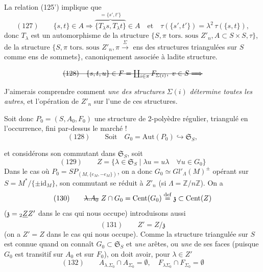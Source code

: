 \documentclass[11pt,a4paper]{article}
\begin{document}
La relation (125') implique que
\[
  (127)\qquad \{s,t\}\in A \Longrightarrow
  \overbrace{\{T_{\lambda}s, T_{\lambda}t\}}^{=\{s',t'\}}\in A
  \quad\text{et}\quad \tau(\{s',t'\}) = \lambda^{2}\,\tau(\{s,t\}),
\]
donc $T_{\lambda}$ est un automorphisme de la structure
$\{S, \pi \text{ tors.\ sous } Z'_n, A\subset S\times S, \tau\}$,
\struck{\ill{}}  de la structure
$\{S, \pi \text{ tors.\ sous } Z'_n, \pi \xrightarrow{\Sigma}$ ens des structures
triangulées sur $S$ comme ens de sommets$\}$, canoniquement associée à ladite
structure.

\[
  \text{\struck{$(128)\quad \{s,t,u\}\in F=\coprod_{i\in\pi} F_{\Sigma(i)},\ v\in S
  \Longrightarrow$}}
\]

J'aimerais comprendre comment \emph{une des structures} $\Sigma(i)$
\emph{détermine toutes les autres}, et l'opération de $Z'_n$ sur l'une de ces
structures.

Soit donc $P_0=(S,A_0,F_0)$ une structure de 2-polyèdre  régulier,
triangulé en l'occurrence, fini par-dessus le marché !
\[
  (128)\qquad \text{Soit}\quad G_0 = \mathrm{Aut}(P_0) \hookrightarrow \mathfrak{S}_S ,
\]


et considérons son \struck{\ill{}} commutant dans $\mathfrak{S}_S$, soit
\[
  (129)\qquad Z = \{\lambda\in\mathfrak{S}_S \mid \lambda u = u\lambda
  \quad \forall u\in G_0\}
\]
Dans le cas où $P_0 = SP_{(M,\{e_M,-e_M\})}$, on a donc
$G_0 \simeq Gl'_{\Lambda}(M)^{\pm}$ opérant sur $S=M^{*}/\{\pm\mathrm{id}_M\}$, son
commutant se réduit à $Z'_n$ (si $\Lambda=\mathbb{Z}/n\mathbb{Z}$).
 On a
\[
  (130)\qquad \text{\struck{$\lambda.A_0$}}\ Z\cap G_0 = \mathrm{Cent}(G_0)
  \overset{\mathrm{def}}{=} \mathfrak{z} \subset \mathrm{Cent}(Z)
\]
($\mathfrak{z} = {}_2\struck{Z}Z'$ dans le cas qui nous occupe)
 introduisons aussi
\[
  (131)\qquad Z' = Z/\mathfrak{z}
\]
(on a $Z'=Z$ dans le cas qui nous occupe). Comme la structure 
triangulée sur $S$ est connue quand on connaît $G_0\subset\mathfrak{S}_S$ et
\emph{une}  arêtes, ou \emph{une} de ses faces (puisque $G_0$ est
transitif sur $A_0$ et sur $F_0$), on doit avoir, pour $\lambda\in Z'$
\[
  (132)\qquad A_{\lambda.\Sigma_0}\cap A_{\Sigma_0} = \emptyset, \quad
  F_{\lambda\Sigma_0}\cap F_{\Sigma_0} = \emptyset
\]
\end{document}
